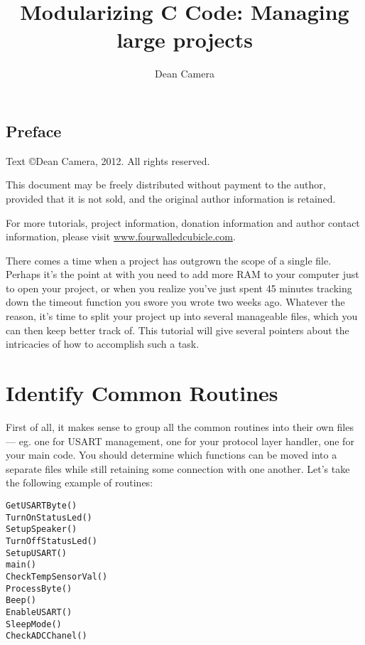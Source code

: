 \documentclass[a4paper,oneside]{book}
\begin{document}
\title{Modularizing C Code: Managing large projects}
\author{Dean Camera}
\maketitle

\cleardoublepage
\subsection*{Preface}
Text \copyright Dean Camera, 2012. All rights reserved.

This document may be freely distributed without payment to the author, provided that it is not sold, and the original author information is retained.

For more tutorials, project information, donation information and author contact information, please visit \href{http://www.fourwalledcubicle.com}{www.fourwalledcubicle.com}.

\cleardoublepage
\tableofcontents
\cleardoublepage

There comes a time when a project has outgrown the scope of a single file. Perhaps it's the point at with you need to add more RAM to your computer just to open your project, or when you realize you've just spent 45 minutes tracking down the timeout function you swore you wrote two weeks ago. Whatever the reason, it's time to split your project up into several manageable files, which you can then keep better track of. This tutorial will give several pointers about the intricacies of how to accomplish such a task.

\section{Identify Common Routines}

First of all, it makes sense to group all the common routines into their own files --- eg. one for USART management, one for your protocol layer handler, one for your main code. You should determine which functions can be moved into a separate files while still retaining some connection with one another. Let's take the following example of routines:

\begin{center}
\begin{lstlisting}
GetUSARTByte()
TurnOnStatusLed()
SetupSpeaker()
TurnOffStatusLed()
SetupUSART()
main()
CheckTempSensorVal()
ProcessByte()
Beep()
EnableUSART()
SleepMode()
CheckADCChanel()
\end{lstlisting}
\end{center}
\end{document}
